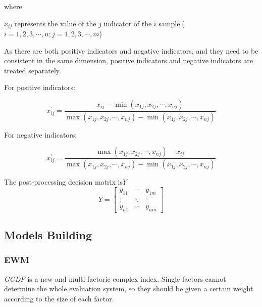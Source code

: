 \documentclass[12pt]{article}
\begin{document}
	where
	
	\qquad $x_{ij}$ represents the value of the $j$ indicator of the $i$ sample.($i=1,2,3,\cdots,n;j=1,2,3,\cdots,m$)
	
	As there are both positive indicators and negative indicators, and they need to be consistent in the same dimension, positive indicators and negative indicators are treated separately.
	
	For positive indicators:
	
	\begin{equation}\label{eq:forward}
		x_{ij}^{'}= \frac{x_{ij}-\min(x_{1j},x_{2j},\cdots,x_{nj})}{\max(x_{1j},x_{2j},\cdots,x_{nj}) - \min(x_{1j},x_{2j},\cdots,x_{nj})}
	\end{equation}
	
	For negative indicators:
	
	\begin{equation}\label{eq:backward}
		x_{ij}^{'}= \frac{\max(x_{1j},x_{2j},\cdots,x_{nj})-x_{ij}}{\max(x_{1j},x_{2j},\cdots,x_{nj}) - \min(x_{1j},x_{2j},\cdots,x_{nj})}
	\end{equation}
	
	The post-processing decision matrix is$Y$
	\begin{equation}\label{mat:normalize}
		Y=
		\begin{bmatrix}
			y_{11} & \cdots  & y_{1m}\\
			\vdots  & \ddots & \vdots \\
			y_{n1} & \cdots & y_{nm}
		\end{bmatrix}
	\end{equation}
	

	
	\subsection{Models Building} %
	\subsubsection{EWM}\label{getweight}
	\textit{GGDP} is a new and multi-factoric complex index.
	Single factors cannot determine the whole evaluation system, so they should be given a certain weight according to the size of each factor.
	
\end{document}
